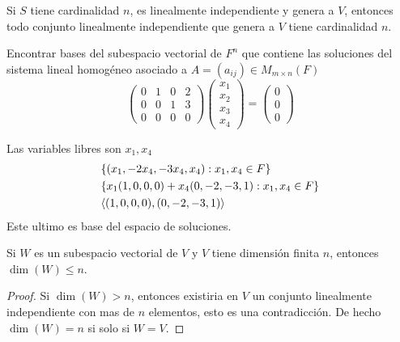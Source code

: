 \documentclass[12pt,a4paper]{book}
\begin{document}
    \begin{proposicion}
        Si $S$ tiene cardinalidad $n$, es linealmente independiente y genera a $V$, entonces todo
        conjunto linealmente independiente que genera a $V$ tiene cardinalidad $n$.
    \end{proposicion}

    Encontrar bases del subespacio vectorial de $F^{n}$ que contiene las soluciones del sistema
    lineal homogéneo asociado a $A=(a_{ij})\in M_{m\times n}(F)$
    \begin{equation*}
        \begin{pmatrix}
            0 & 1 & 0 & 2\\
            0 & 0 & 1 & 3\\
            0 & 0 & 0 & 0
        \end{pmatrix}
        \begin{pmatrix}
            x_{1}\\
            x_{2}\\
            x_{3}\\
            x_{4}
        \end{pmatrix}
        =
        \begin{pmatrix}
            0\\
            0\\
            0
        \end{pmatrix}
    \end{equation*}

    Las variables libres son $x_{1},x_{4}$
    \begin{align*}
        &\{(x_{1},-2x_{4},-3x_{4},x_{4}):x_{1},x_{4}\in F\}\\
        &\{x_{1}(1,0,0,0)+x_{4}(0,-2,-3,1):x_{1},x_{4}\in F\}\\
        &\langle (1,0,0,0),(0,-2,-3,1) \rangle
    \end{align*}
    Este ultimo es base del espacio de soluciones.

    \begin{proposicion}
        Si $W$ es un subespacio vectorial de $V$ y $V$ tiene dimensión finita $n$, entonces
        $\dim(W)\leq n$.
    \end{proposicion}

    \begin{proof}
        Si $\dim(W)\gt n$, entonces existiria en $V$ un conjunto linealmente independiente con mas
        de $n$ elementos, esto es una contradicción. De hecho $\dim(W)=n$ si solo si $W=V$.
    \end{proof}
\end{document}
